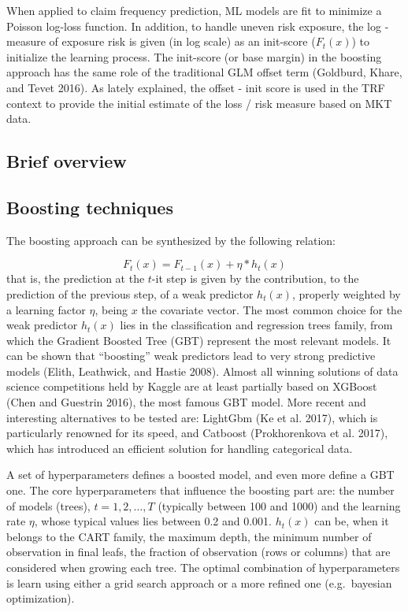 \documentclass[
]{article}
\begin{document}
When applied to claim frequency prediction, ML models are fit to
minimize a Poisson log-loss function. In addition, to handle uneven risk
exposure, the log - measure of exposure risk is given (in log scale) as
an init-score (\(F_t\left(x\right)\)) to initialize the learning
process. The init-score (or base margin) in the boosting approach has
the same role of the traditional GLM offset term (Goldburd, Khare, and
Tevet 2016). As lately explained, the offset - init score is used in the
TRF context to provide the initial estimate of the loss / risk measure
based on MKT data.

\hypertarget{brief-overview}{%
\subsection{Brief overview}\label{brief-overview}}

\hypertarget{boosting-techniques}{%
\subsection{Boosting techniques}\label{boosting-techniques}}

The boosting approach can be synthesized by the following relation:

\[F_t\left(x\right)=F_{t-1}\left(x\right)+\eta*h_t\left(x\right)\] that
is, the prediction at the \(t\)-it step is given by the contribution, to
the prediction of the previous step, of a weak predictor
\(h_t\left(x\right)\), properly weighted by a learning factor \(\eta\),
being \(x\) the covariate vector. The most common choice for the weak
predictor \(h_t\left(x\right)\) lies in the classification and
regression trees family, from which the Gradient Boosted Tree (GBT)
represent the most relevant models. It can be shown that ``boosting''
weak predictors lead to very strong predictive models (Elith, Leathwick,
and Hastie 2008). Almost all winning solutions of data science
competitions held by Kaggle are at least partially based on XGBoost
(Chen and Guestrin 2016), the most famous GBT model. More recent and
interesting alternatives to be tested are: LightGbm (Ke et al. 2017),
which is particularly renowned for its speed, and Catboost
(Prokhorenkova et al. 2017), which has introduced an efficient solution
for handling categorical data.

A set of hyperparameters defines a boosted model, and even more define a
GBT one. The core hyperparameters that influence the boosting part are:
the number of models (trees), \(t=1,2,\ldots, T\) (typically between 100
and 1000) and the learning rate \(\eta\), whose typical values lies
between 0.2 and 0.001. \(h_t\left(x\right)\) can be, when it belongs to
the CART family, the maximum depth, the minimum number of observation in
final leafs, the fraction of observation (rows or columns) that are
considered when growing each tree. The optimal combination of
hyperparameters is learn using either a grid search approach or a more
refined one (e.g.~bayesian optimization).
\end{document}
